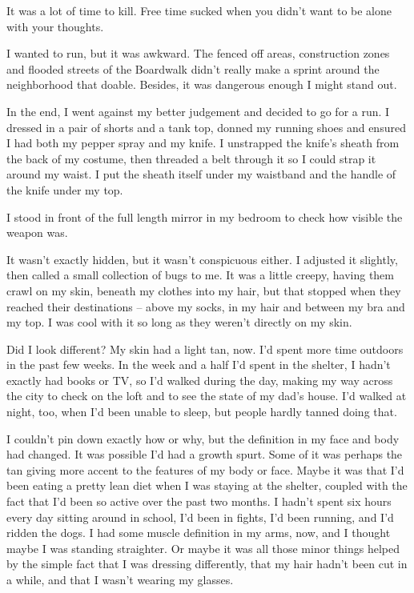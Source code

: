 It was a lot of time to kill.  Free time sucked when you didn't want to be alone with your thoughts.



I wanted to run, but it was awkward.  The fenced off areas, construction zones and flooded streets of the Boardwalk didn't really make a sprint around the neighborhood that doable.  Besides, it was dangerous enough I might stand out.



In the end, I went against my better judgement and decided to go for a run.  I dressed in a pair of shorts and a tank top, donned my running shoes and ensured I had both my pepper spray and my knife.  I unstrapped the knife's sheath from the back of my costume, then threaded a belt through it so I could strap it around my waist.  I put the sheath itself under my waistband and the handle of the knife under my top.



I stood in front of the full length mirror in my bedroom to check how visible the weapon was.



It wasn't exactly hidden, but it wasn't conspicuous either.  I adjusted it slightly, then called a small collection of bugs to me.  It was a little creepy, having them crawl on my skin, beneath my clothes into my hair, but that stopped when they reached their destinations – above my socks, in my hair and between my bra and my top.  I was cool with it so long as they weren't directly on my skin.



Did I look different?  My skin had a light tan, now. I'd spent more time outdoors in the past few weeks.  In the week and a half I'd spent in the shelter, I hadn't exactly had books or TV, so I'd walked during the day, making my way across the city to check on the loft and to see the state of my dad's house.  I'd walked at night, too, when I'd been unable to sleep, but people hardly tanned doing that.



I couldn't pin down exactly how or why, but the definition in my face and body had changed.  It was possible I'd had a growth spurt.  Some of it was perhaps the tan giving more accent to the features of my body or face.  Maybe it was that I'd been eating a pretty lean diet when I was staying at the shelter, coupled with the fact that I'd been so active over the past two months.  I hadn't spent six hours every day sitting around in school, I'd been in fights, I'd been running, and I'd ridden the dogs.  I had some muscle definition in my arms, now, and I thought maybe I was standing straighter.  Or maybe it was all those minor things helped by the simple fact that I was dressing differently, that my hair hadn't been cut in a while, and that I wasn't wearing my glasses.



